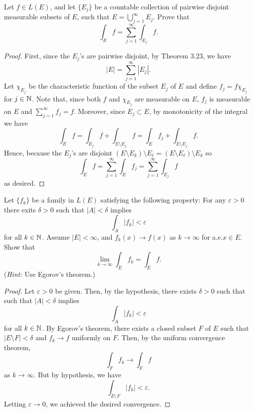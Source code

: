 \begin{problem}
Let $f\in L(E)$, and let $\{E_j\}$ be a countable collection of pairwise
disjoint measurable subsets of $E$, such that $E=\bigcup_{j=1}^\infty
E_j$. Prove that
\[
\int_E f=\sum_{j=1}^\infty\int_{E_j}f.
\]
\end{problem}
\begin{proof}
First, since the $E_j$'s are pairwise disjoint, by Theorem 3.23, we have
\begin{equation}
\label{eq:disjoint-measure-2-2}
|E|=\sum_{j=1}^\infty|E_j|.
\end{equation}
Let $\chi_{E_j}$ be the characteristic function of the subset $E_j$ of
$E$ and define $f_j= f\chi_{E_j}$ for $j\in\mathbb{N}$. Note that, since
both $f$ and $\chi_{E_j}$ are measurable on $E$, $f_j$ is
measurable on $E$ and $\sum_{j=1}^\infty f_j=f$. Moreover, since
$E_j\subset E$, by monotonicity of the integral we have
\begin{equation}
\label{eq:monotonicity-2-2}
\int_{E} f=
\int_{E_j} f+\int_{E\setminus E_j}f=
\int_E f_j+\int_{E\setminus E_j}f.
\end{equation}
Hence, because the $E_j$'s are disjoint $(E\setminus E_k)\setminus
E_\ell=(E\setminus E_\ell)\setminus E_k$ so
\begin{equation}
\label{eq:desired-sum-2}
\int_E f=\sum_{j=1}^\infty\int_E f_j=\sum_{j=1}^\infty\int_{E_j}f
\end{equation}
as desired.
\end{proof}

\begin{problem}
Let $\{f_k\}$ be a family in $L(E)$ satisfying the following property:
For any $\varepsilon>0$ there exits $\delta>0$ such that $|A|<\delta$
implies
\[
\int_A |f_k|<\varepsilon
\]
for all $k\in\mathbb{N}$. Assume $|E|<\infty$, and $f_k(x)\to f(x)$ as
$k\to\infty$ for a.e.\@ $x\in E$. Show that
\[
\lim_{k\to\infty}\int_E f_k=\int_E f.
\]
(\emph{Hint:} Use Egorov's theorem.)
\end{problem}
\begin{proof}
Let $\varepsilon>0$ be given. Then, by the hypothesis, there exists
$\delta>0$ such that
such that $|A|<\delta$
implies
\begin{equation}
  \label{eq:hypothesis-2-3}
\int_A |f_k|<\varepsilon
\end{equation}
for all $k\in\mathbb{N}$. By Egorov's theorem, there exists a closed subset $F$
of $E$ such that $|E\setminus F|<\delta$ and $f_k\to f$ uniformly on
$F$. Then, by the uniform convergence theorem,
\begin{equation}
\label{eq:uniform-convergence-2-3}
\int_F f_k\longrightarrow \int_F f
\end{equation}
as $k\to\infty$. But by hypothesis, we have
\begin{equation}
\label{eq:need-to-show-2-}
\int_{E\setminus F} |f_k|<\varepsilon.
\end{equation}
Letting $\varepsilon\to 0$, we achieved the desired convergence.
\end{proof}

